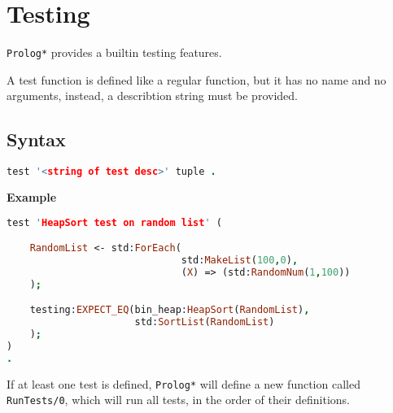 \section{Testing}

\texttt{Prolog*} provides a builtin testing features.

A test function is defined like a regular function, but it has no
name and no arguments, instead, a describtion string must be provided. 

\subsection{Syntax}

\begin{lstlisting}[language = Prolog]
test '<string of test desc>' tuple .
\end{lstlisting}

\textbf{Example}

\begin{lstlisting}[language = Prolog]
test 'HeapSort test on random list' (

    RandomList <- std:ForEach( 
                              std:MakeList(100,0), 
                              (X) => (std:RandomNum(1,100))
    );

    testing:EXPECT_EQ(bin_heap:HeapSort(RandomList),
                      std:SortList(RandomList)
    );
)
.
\end{lstlisting}

If at least one test is defined, \texttt{Prolog*} will define a new function called
\texttt{RunTests/0}, which will run all tests, in the order of their definitions. 


